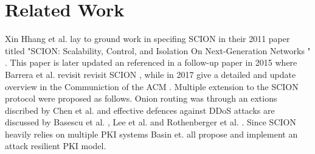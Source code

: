 \documentclass[../eva1_scion.tex]{subfiles}
\begin{document}
    \chapter{Related Work}\label{ch:related_work}

    Xin Hhang et al. lay to ground work in specifing SCION in their 2011 paper titled "SCION: Scalability, Control, and Isolation On Next-Generation Networks
" \cite{scion_2011}. This paper is later updated an referenced in a follow-up paper in 2015 where Barrera et al. revisit revisit SCION \cite{scion_2015}, while in 2017 give a detailed and update overview in the Communiction of the ACM \cite{scion_2017}. Multiple extension to the SCION protocol were proposed as follows. Onion routing was through an extions discribed by Chen et al. \cite{hornet_2015, hornet_2016} and effective defences against DDoS attacks are discussed by Basescu et al. \cite{sibra_2016}, Lee et al. \cite{lee_2017} and Rothenberger et al. \cite{piskes_2020}.
    Since SCION heavily relies on multiple PKI systems Basin et. all propose \cite{arpki_2014} and implement \cite{arpki_2018} an attack resilient PKI model.
\end{document}
